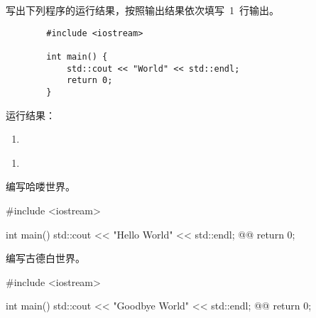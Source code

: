 \documentclass[answer,sheet]{cuzexam} %
\begin{document}
\begin{problem}
    写出下列程序的运行结果，按照输出结果依次填写~1~行输出。
    \begin{verbatim}
        #include <iostream>
        
        int main() {
            std::cout << "World" << std::endl;
            return 0;
        }
    \end{verbatim}
    运行结果：
    \begin{enumerate}[label=(\arabic*),resume=cuzafter]
        \item {}
    \end{enumerate}
\end{problem}

\begin{sheetcontents}
    \begin{enumerate}[label=(\arabic*)]
        \item {}
    \end{enumerate}
\end{sheetcontents}


\begin{problem}
    编写哈喽世界。
\end{problem}

\begin{solution}
    \begin{cppcode}
        #include <iostream> 
        
        int main() {
            std::cout << "Hello World" << std::endl; @@
            return 0;
        }
    \end{cppcode}
\end{solution}

\begin{studentanswer}
    \newpage
\end{studentanswer}

\begin{problem}
    编写古德白世界。
\end{problem}

\begin{solution}
    \begin{cppcode}
        #include <iostream> 
        
        int main() {
            std::cout << "Goodbye World" << std::endl; @@
            return 0;
        }
    \end{cppcode}
\end{solution}
\end{document}
